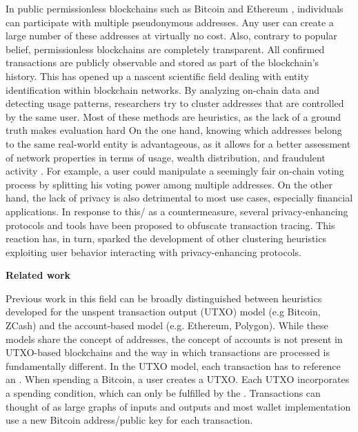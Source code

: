 \documentclass[12pt,a4paper,titlepage,oneside,english]{article}
\begin{document}
In public permissionless blockchains such as Bitcoin \citep{nakamotoBitcoin2008} and Ethereum \citep{buterin2014ethereum}, individuals can participate with multiple pseudonymous addresses. Any user can create a large number of these addresses at virtually no cost. Also, contrary to popular belief, permissionless blockchains are completely transparent. All confirmed transactions are publicly observable and stored as part of the blockchain’s history. 
This has opened up a nascent scientific field dealing with entity identification within blockchain networks. By analyzing on-chain data and detecting usage patterns, researchers try to cluster addresses that are controlled by the same user. Most of these methods are heuristics, as the lack of a ground truth makes evaluation hard \newline
On the one hand, knowing which addresses belong to the same real-world entity is advantageous, as it allows for a better assessment of network properties in terms of usage, wealth distribution, and fraudulent activity \citep{FV:17}. For example, a user could manipulate a seemingly fair on-chain voting process by splitting his voting power among multiple addresses. \newline
On the other hand, the lack of privacy is also detrimental to most use cases, especially financial applications. In response to this/ as a countermeasure, several privacy-enhancing protocols and tools have been proposed to obfuscate transaction tracing. This reaction has, in turn, sparked the development of other clustering heuristics exploiting user behavior interacting with privacy-enhancing protocols. \newline



\textbf{Related work}

Previous work in this field can be broadly distinguished between heuristics developed for the unspent transaction output (UTXO) model (e.g Bitcoin, ZCash) and the account-based model (e.g. Ethereum, Polygon). While these models share the concept of addresses, the concept of accounts is not present in UTXO-based blockchains and the way in which transactions are processed is fundamentally different.
In the UTXO model, each transaction has to reference an . When spending a Bitcoin, a user creates a UTXO. Each UTXO incorporates a spending condition, which can only be fulfilled by the . Transactions can thought of as large graphs of inputs and outputs and most wallet implementation use a new Bitcoin address/public key for each transaction.
\end{document}
